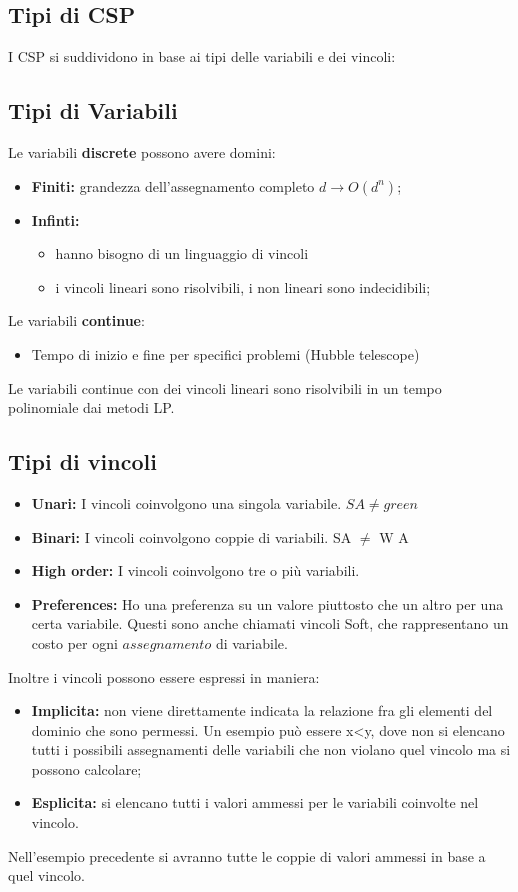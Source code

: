 \subsection{Tipi di CSP}
I CSP si suddividono in base ai tipi delle variabili e dei vincoli:
\subsection{Tipi di Variabili}
Le variabili \textbf{discrete} possono avere domini:
\begin{itemize}
    \item \textbf{Finiti:} grandezza dell’assegnamento completo $d \rightarrow O(d^n)$;
    \item \textbf{Infinti:} 
    \begin{itemize}
        \item hanno bisogno di un linguaggio di vincoli
        \item i vincoli lineari sono risolvibili, i non lineari sono indecidibili;
    \end{itemize}
\end{itemize}
Le variabili \textbf{continue}:
\begin{itemize}
    \item Tempo di inizio e fine per specifici problemi (Hubble telescope)
\end{itemize}
Le variabili continue con dei vincoli lineari sono risolvibili in un tempo polinomiale
dai metodi LP.
\newpage
\subsection{Tipi di vincoli}
\begin{itemize}
    \item \textbf{Unari:} I vincoli coinvolgono una singola variabile. $SA \neq green$
    \item \textbf{Binari:} I vincoli coinvolgono coppie di variabili. SA $\neq$ W A
    \item \textbf{High order:} I vincoli coinvolgono tre o più variabili.
    \item \textbf{Preferences:} Ho una preferenza su un valore piuttosto che un altro per una certa variabile. Questi sono anche chiamati vincoli Soft, che rappresentano un costo per ogni $assegnamento$ di variabile.
\end{itemize}
Inoltre i vincoli possono essere espressi in maniera:
\begin{itemize}
    \item \textbf{Implicita:} non viene direttamente indicata la relazione fra gli elementi del dominio che sono permessi. Un esempio può essere x<y, dove non si elencano tutti i possibili assegnamenti delle variabili che non violano quel vincolo ma si possono calcolare;
    \item \textbf{Esplicita:} si elencano tutti i valori ammessi per le variabili coinvolte nel vincolo. 
\end{itemize}
Nell’esempio precedente si avranno tutte le coppie di valori ammessi in base a quel
vincolo.
\newpage
